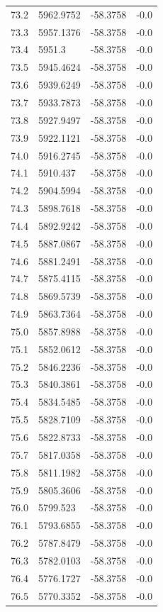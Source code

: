 \begin{table}[H]
\begin{tabular}{llll}
73.2 & 5962.9752 & -58.3758 & -0.0 \\
73.3 & 5957.1376 & -58.3758 & -0.0 \\
73.4 & 5951.3 & -58.3758 & -0.0 \\
73.5 & 5945.4624 & -58.3758 & -0.0 \\
73.6 & 5939.6249 & -58.3758 & -0.0 \\
73.7 & 5933.7873 & -58.3758 & -0.0 \\
73.8 & 5927.9497 & -58.3758 & -0.0 \\
73.9 & 5922.1121 & -58.3758 & -0.0 \\
74.0 & 5916.2745 & -58.3758 & -0.0 \\
74.1 & 5910.437 & -58.3758 & -0.0 \\
74.2 & 5904.5994 & -58.3758 & -0.0 \\
74.3 & 5898.7618 & -58.3758 & -0.0 \\
74.4 & 5892.9242 & -58.3758 & -0.0 \\
74.5 & 5887.0867 & -58.3758 & -0.0 \\
74.6 & 5881.2491 & -58.3758 & -0.0 \\
74.7 & 5875.4115 & -58.3758 & -0.0 \\
74.8 & 5869.5739 & -58.3758 & -0.0 \\
74.9 & 5863.7364 & -58.3758 & -0.0 \\
75.0 & 5857.8988 & -58.3758 & -0.0 \\
75.1 & 5852.0612 & -58.3758 & -0.0 \\
75.2 & 5846.2236 & -58.3758 & -0.0 \\
75.3 & 5840.3861 & -58.3758 & -0.0 \\
75.4 & 5834.5485 & -58.3758 & -0.0 \\
75.5 & 5828.7109 & -58.3758 & -0.0 \\
75.6 & 5822.8733 & -58.3758 & -0.0 \\
75.7 & 5817.0358 & -58.3758 & -0.0 \\
75.8 & 5811.1982 & -58.3758 & -0.0 \\
75.9 & 5805.3606 & -58.3758 & -0.0 \\
76.0 & 5799.523 & -58.3758 & -0.0 \\
76.1 & 5793.6855 & -58.3758 & -0.0 \\
76.2 & 5787.8479 & -58.3758 & -0.0 \\
76.3 & 5782.0103 & -58.3758 & -0.0 \\
76.4 & 5776.1727 & -58.3758 & -0.0 \\
76.5 & 5770.3352 & -58.3758 & -0.0 \\

\end{tabular}
\end{table}
